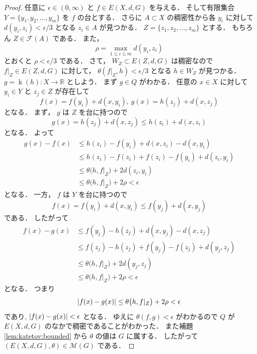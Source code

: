 \documentclass[leqno, 12pt]{jsarticle}
\newcommand{\rr}{\mathbb{R}}
\DeclareMathOperator{\kat}{k}
\newcommand{\KatExt}[1]{\kat(#1)}
\DeclarePairedDelimiter{\abs}{\lvert}{\rvert}
\newcommand{\Met}[1]{\mathscr{M}(#1)}
\newcommand{\restr}[2]{#1|_{#2}}
\newcommand{\Espace}[3]{E(#1,#2,#3)}
\newcommand{\KatDist}{\theta}
\newcommand{\FinSubsets}[1]{\mathcal{F}(#1)}
\begin{document}
\begin{proof}
任意に
$\epsilon \in (0, \infty)$
と
$f\in \Espace{X}{d}{G}$
を与える．
そして有限集合
$Y=\{y_1,y_2,\dots, y_m\}$
を
$f$
の台とする．
さらに
$A\subset X$
の稠密性から各
$y_{i}$
に対して
$d(y_{i},z_{i})<\epsilon/3$%
となる
$z_{i}\in A$
が見つかる．
$Z=\{z_{1}, z_{2},\dots, z_{m}\}$
とする．
もちろん
$Z\in \FinSubsets{A}$
である．
また，
\[
\rho=\max_{1\le i\le m}d(y_i,z_i)
\]
とおくと
$\rho<\epsilon/3$
である．
さて，
$W_Z\subset \Espace{Z}{d}{G}$
は稠密なので
$\restr{f}{Z}\in \Espace{Z}{d}{G}$
に対して，
$\KatDist(\restr{f}{Z}, h)<\epsilon/3$
となる
$h\in W_{Z}$
が見つかる．
$g=\KatExt{h}\colon X\to \rr$
としよう．
まず
$g\in Q$
がわかる．
任意の
$x\in X$
に対して
$y_{i}\in Y$
と
$z_{j}\in Z$
が存在して
\[
f(x)=f(y_{i})+d(x, y_{i}),\ g(x)=h(z_{j})+d(x,z_{j})
\]
となる．
まず，
$g$
は
$Z$
を台に持つので
\[
g(x)=h(z_{j})+d(x, z_{j})\le h(z_{i})+d(x, z_{i})
\]
となる．
よって
\begin{align*}
g(x)-f(x)
&\le
 h(z_{i})-f(y_{i})+d(x, z_{i})-d(x, y_{i})\\
&\le
h(z_{i})-f(z_{i})+f(z_{i})-f(y_{i})+d(z_{i}, y_{i})\\
&\le
\KatDist\bigl(h,\restr{f}{Z}\bigr)+2d(z_{i}, y_{i})\\
&\le
\KatDist\bigl(h,\restr{f}{Z}\bigr)+2\rho
<\epsilon
\end{align*}
となる．
一方，
$f$
は
$Y$
を台に持つので
\[
f(x)=f(y_i)+d(x,y_i)
\le f(y_j)+d(x,y_j)
\]
である．
したがって
\begin{align*}
f(x)-g(x)
&\le
f(y_j)-h(z_j)+d(x,y_j)-d(x,z_j)\\
&\le
f(z_j)-h(z_j)+f(y_j)-f(z_j)+d(y_j,z_j)\\
&\le
\KatDist\bigl(h,\restr{f}{Z}\bigr)+2d(y_j,z_j)\\
&\le
\KatDist\bigl(h,\restr{f}{Z}\bigr)+2\rho
<\epsilon
\end{align*}
となる．
つまり
\[
\abs{f(x)-g(x)}
\le
\KatDist\bigl(h,\restr{f}{Z}\bigr)+2\rho
<\epsilon
\]
であり,
$\abs{f(x)-g(x)}<\epsilon$
となる．
ゆえに
$\KatDist(f, g)<\epsilon$
がわかるので
$Q$
が
$\Espace{X}{d}{G}$
のなかで稠密であることがわかった．
また補題
\ref{lem:katetov:bounded}
から
$\KatDist$
の値は
$G$
に属する．
したがって
$(\Espace{X}{d}{G},\KatDist)\in\Met{G}$
である．
\end{proof}
\end{document}
